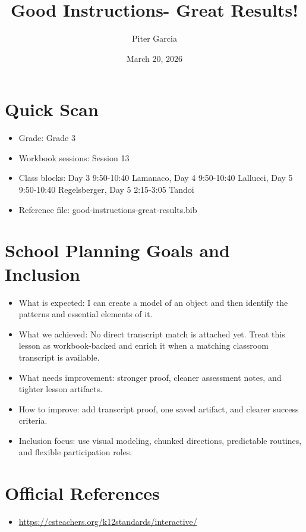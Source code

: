 \documentclass[11pt]{article}
\title{Good Instructions- Great Results!}
\author{Piter Garcia}
\date{March 20, 2026}
\begin{document}
\maketitle
\section*{Quick Scan}
\begin{itemize}[leftmargin=*]
\item Grade: Grade 3
\item Workbook sessions: Session 13
\item Class blocks: Day 3 9:50-10:40 Lamanaco, Day 4 9:50-10:40 Lallucci, Day 5 9:50-10:40 Regelsberger, Day 5 2:15-3:05 Tandoi
\item Reference file: good-instructions-great-results.bib
\end{itemize}
\section*{School Planning Goals and Inclusion}
\begin{itemize}[leftmargin=*]
\item What is expected: I can create a model of an object and then identify the patterns and essential elements of it.
\item What we achieved: No direct transcript match is attached yet. Treat this lesson as workbook-backed and enrich it when a matching classroom transcript is available.
\item What needs improvement: stronger proof, cleaner assessment notes, and tighter lesson artifacts.
\item How to improve: add transcript proof, one saved artifact, and clearer success criteria.
\item Inclusion focus: use visual modeling, chunked directions, predictable routines, and flexible participation roles.
\end{itemize}
\section*{Official References}
\begin{itemize}[leftmargin=*]
\item \url{https://csteachers.org/k12standards/interactive/}

\end{itemize}
\end{document}
